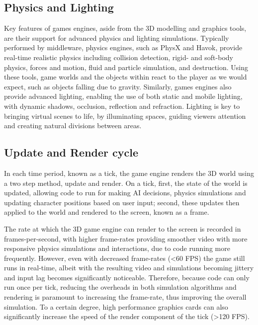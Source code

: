 \subsection{Physics and Lighting}
\label{subs:Physics and Lighting}
Key features of games engines, aside from the 3D modelling and graphics tools, are their support for advanced physics and lighting simulations. Typically performed by middleware, physics engines, such as PhysX\cite{physx} and Havok\cite{havok}, provide real-time realistic physics including collision detection, rigid- and soft-body physics, forces and motion, fluid and particle simulation, and destruction. Using these tools, game worlds and the objects within react to the player as we would expect, such as objects falling due to gravity.
Similarly, games engines also provide advanced lighting, enabling the use of both static and mobile lighting, with dynamic shadows, occlusion, reflection and refraction. Lighting is key to bringing virtual scenes to life, by illuminating spaces, guiding viewers attention and creating natural divisions between areas.


\subsection{Update and Render cycle}
\label{subs:Mode of Operation}
In each time period, known as a tick, the game engine renders the 3D world using a two step method, update and render. On a tick, first, the state of the world is updated, allowing code to run for making AI decisions, physics simulations and updating character positions based on user input; second, these updates then applied to the world and rendered to the screen, known as a frame.

The rate at which the 3D game engine can render to the screen is recorded in frames-per-second, with higher frame-rates providing smoother video with more responsive physics simulations and interactions, due to code running more frequently. However, even with decreased frame-rates (\textless60 FPS) the game still runs in real-time, albeit with the resulting video and simulations becoming jittery and input lag becomes significantly noticeable. Therefore, because code can only run once per tick, reducing the overheads in both simulation algorithms and rendering is paramount to increasing the frame-rate, thus improving the overall simulation. To a certain degree, high performance graphics cards can also significantly increase the speed of the render component of the tick (\textgreater120 FPS).

